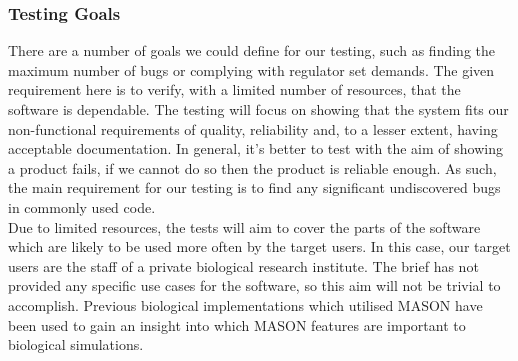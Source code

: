 \documentclass[11pt]{article}
\begin{document}


\subsubsection{Testing Goals}

There are a number of goals we could define for our testing, such as finding the maximum number of bugs or complying with regulator set demands.
The given requirement here is to verify, with a limited number of resources, that the software is dependable.
The testing will focus on showing that the system fits our non-functional requirements of quality, reliability and, to a lesser extent, having acceptable documentation.
In general, it's better to test with the aim of showing a product fails, if we cannot do so then the product is reliable enough\cite[pp. 20]{lessons_book}.
As such, the main requirement for our testing is to find any significant undiscovered bugs in commonly used code.
\\


Due to limited resources, the tests will aim to cover the parts of the software which are likely to be used more often by the target users.
In this case, our target users are the staff of a private biological research institute.
The brief has not provided any specific use cases for the software, so this aim will not be trivial to accomplish.
Previous biological implementations which utilised MASON\cite{ppsim} have been used to gain an insight into which MASON features are important to biological simulations.
\\
\end{document}
